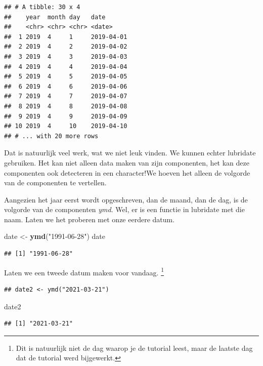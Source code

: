 \documentclass[]{tufte-book}
\newenvironment{Shaded}{}{}
\newcommand{\KeywordTok}[1]{\textcolor[rgb]{0.00,0.44,0.13}{\textbf{#1}}}
\newcommand{\NormalTok}[1]{#1}
\newcommand{\StringTok}[1]{\textcolor[rgb]{0.25,0.44,0.63}{#1}}
\begin{document}
\begin{verbatim}
## # A tibble: 30 x 4
##    year  month day   date      
##    <chr> <chr> <chr> <date>    
##  1 2019  4     1     2019-04-01
##  2 2019  4     2     2019-04-02
##  3 2019  4     3     2019-04-03
##  4 2019  4     4     2019-04-04
##  5 2019  4     5     2019-04-05
##  6 2019  4     6     2019-04-06
##  7 2019  4     7     2019-04-07
##  8 2019  4     8     2019-04-08
##  9 2019  4     9     2019-04-09
## 10 2019  4     10    2019-04-10
## # ... with 20 more rows
\end{verbatim}

Dat is natuurlijk veel werk, wat we niet leuk vinden. We kunnen echter lubridate gebruiken. Het kan niet alleen data maken van zijn componenten, het kan deze componenten ook detecteren in een character!We hoeven het alleen de volgorde van de componenten te vertellen.

Aangezien het jaar eerst wordt opgeschreven, dan de maand, dan de dag, is de volgorde van de componenten \emph{ymd}. Wel, er is een functie in lubridate met die naam. Laten we het proberen met onze eerdere datum.

\begin{Shaded}
\begin{Highlighting}[]
\NormalTok{date <-}\StringTok{ }\KeywordTok{ymd}\NormalTok{(}\StringTok{"1991-06-28"}\NormalTok{)}
\NormalTok{date}
\end{Highlighting}
\end{Shaded}

\begin{verbatim}
## [1] "1991-06-28"
\end{verbatim}

Laten we een tweede datum maken voor vandaag. \footnote{Dit is natuurlijk niet de dag waarop je de tutorial leest, maar de laatste dag dat de tutorial werd bijgewerkt.}

\begin{verbatim}
## date2 <- ymd("2021-03-21")
\end{verbatim}

\begin{Shaded}
\begin{Highlighting}[]
\NormalTok{date2}
\end{Highlighting}
\end{Shaded}

\begin{verbatim}
## [1] "2021-03-21"
\end{verbatim}
\end{document}
